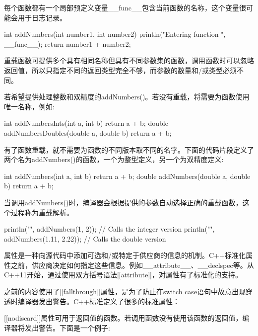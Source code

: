 
每个函数都有一个局部预定义变量\_\_func\_\_包含当前函数的名称，这个变量很可能会用于日志记录。

\begin{cpp}
int addNumbers(int number1, int number2)
{
    println("Entering function {}", __func__);
    return number1 + number2;
}
\end{cpp}


重载函数可提供多个具有相同名称但具有不同参数集的函数，调用函数时可以忽略返回值，所以只指定不同的返回类型完全不够，而参数的数量和/或类型必须不同。

若希望提供处理整数和双精度的addNumbers()。若没有重载，将需要为函数使用唯一名称，例如:

\begin{cpp}
int addNumbersInts(int a, int b) { return a + b; }
double addNumbersDoubles(double a, double b) { return a + b; }
\end{cpp}

有了函数重载，就不需要为函数的不同版本取不同的名字。下面的代码片段定义了两个名为addNumbers()的函数，一个为整型定义，另一个为双精度定义:

\begin{cpp}
int addNumbers(int a, int b) { return a + b; }
double addNumbers(double a, double b) { return a + b; }
\end{cpp}

当调用addNumbers()时，编译器会根据提供的参数自动选择正确的重载函数，这个过程称为重载解析。

\begin{cpp}
println("{}", addNumbers(1, 2)); // Calls the integer version
println("{}", addNumbers(1.11, 2.22)); // Calls the double version
\end{cpp}


属性是一种向源代码中添加可选和/或特定于供应商的信息的机制。C++标准化属性之前，供应商决定如何指定这些信息。例如\_\_attribute\_\_、\_\_declspec等。从C++11开始，通过使用双方括号语法[[attribute]]，对属性有了标准化的支持。

之前的内容使用了[[fallthrough]]属性，是为了防止在switch case语句中故意出现穿透时编译器发出警告。C++标准定义了很多的标准属性：

\mySamllsection{[[nodiscard]]}

[[nodiscard]]属性可用于返回值的函数。若调用函数没有使用该函数的返回值，编译器将发出警告。下面是一个例子:

